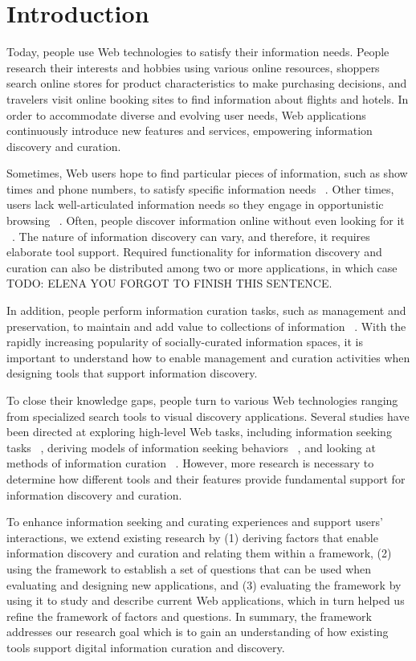 \documentclass{casconpaper}
\begin{document}
{\section{Introduction}
Today, people use Web technologies to satisfy their information needs. People research their interests and hobbies using various online resources, shoppers search online stores for product characteristics to make purchasing decisions, and travelers visit online booking sites to find information about flights and hotels. In order to accommodate diverse and evolving user needs, Web applications continuously introduce new features and services, empowering information discovery and curation. 

Sometimes, Web users hope to find particular pieces of information, such as show times and phone numbers, to satisfy specific information needs ~\cite{proper}. Other times, users lack well-articulated information needs so they engage in opportunistic browsing ~\cite{lindley}. Often, people discover information online without even looking for it ~\cite{bates1986}. The nature of information discovery can vary, and therefore, it requires elaborate tool support. Required functionality for information discovery and curation can also be distributed among two or more applications, in which case TODO: ELENA YOU FORGOT TO FINISH THIS SENTENCE.

In addition, people perform information curation tasks, such as management and preservation, to maintain and add value to collections of information ~\cite{beagrie}. With the rapidly increasing popularity of socially-curated information spaces, it is important to understand how to enable management and curation activities when designing tools that support information discovery.

To close their knowledge gaps, people turn to various Web technologies ranging from specialized search tools to visual discovery applications. Several studies have been directed at exploring high-level Web tasks, including information seeking tasks ~\cite{kellar2006, kellar2007, morrison, sellen}, deriving models of information seeking behaviors ~\cite{choo, ellis1989, ellis1993, ellis1997, bates1986, bates2002}, and looking at methods of information curation ~\cite{beagrie, wittaker}. However, more research is necessary to determine how different tools and their features provide fundamental support for information discovery and curation.

To enhance information seeking and curating experiences and support users' interactions, we extend existing research by (1) deriving factors that enable information discovery and curation and relating them within a framework, (2) using the framework to establish a set of questions that can be used when evaluating and designing new applications, and (3) evaluating the framework by using it to study and describe current Web applications, which in turn helped us refine the framework of factors and questions. In summary, the framework addresses our research goal which is to gain an understanding of how existing tools support digital information curation and discovery. 

}
\end{document}
